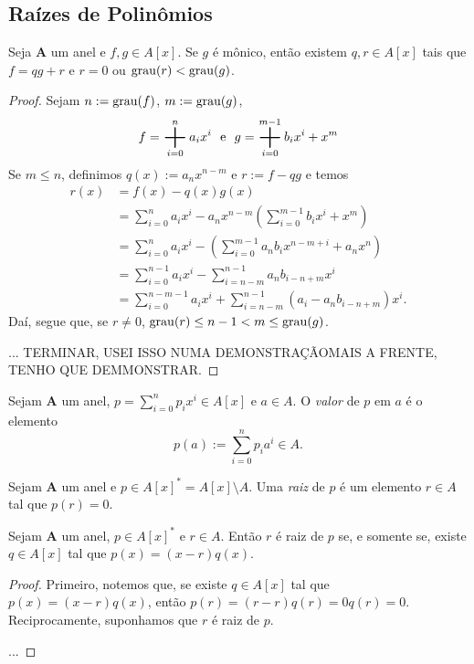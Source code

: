 \subsection{Raízes de Polinômios}

\begin{prop}
Seja $\bm A$ um anel e $f,g \in A[x]$. Se $g$ é mônico, então existem $q,r \in A[x]$ tais que $f=qg+r$ e $r=0$ ou $\operatorname{grau}(r) < \operatorname{grau}(g)$.
\end{prop}
\begin{proof}
Sejam $n := \operatorname{grau}(f)$, $m := \operatorname{grau}(g)$,
	\begin{equation*}
	f = \sum_{i=0}^n a_ix^i \e g = \sum_{i=0}^{m-1} b_ix^i + x^m
	\end{equation*}
Se $m \leq n$, definimos $q(x) := a_nx^{n-m}$ e $r := f-qg$ e temos
	\begin{align*}
	r(x) &= f(x) - q(x)g(x) \\
	&= \sum_{i=0}^n a_ix^i - a_nx^{n-m}\left(\sum_{i=0}^{m-1} b_ix^i + x^m\right) \\
	&= \sum_{i=0}^n a_ix^i - \left(\sum_{i=0}^{m-1} a_nb_ix^{n-m+i} + a_nx^n\right) \\
	&= \sum_{i=0}^{n-1} a_ix^i - \sum_{i=n-m}^{n-1} a_nb_{i-n+m}x^i \\
	&= \sum_{i=0}^{n-m-1} a_ix^i + \sum_{i=n-m}^{n-1} (a_i - a_nb_{i-n+m})x^i.
	\end{align*}
Daí, segue que, se $r \neq 0$, $\operatorname{grau}(r) \leq n-1 < m  \leq \operatorname{grau}(g)$.

... TERMINAR, USEI ISSO NUMA DEMONSTRAÇÃOMAIS A FRENTE, TENHO QUE DEMMONSTRAR.
\end{proof}

\begin{defi}
Sejam $\bm A$ um anel, $p = \sum_{i=0}^n p_ix^i \in A[x]$ e $a \in A$. O \emph{valor} de $p$ em $a$ é o elemento
	\begin{equation*}
	p(a) := \sum_{i=0}^n p_ia^i \in A.
	\end{equation*}
\end{defi}

\begin{defi}
	Sejam $\bm A$ um anel e $p \in A[x]^* = A[x] \setminus A$. Uma \emph{raiz} de $p$ é um elemento $r \in A$ tal que $p(r)=0$.
\end{defi}

\begin{prop}
	Sejam $\bm A$ um anel, $p \in A[x]^*$ e $r \in A$. Então $r$ é raiz de $p$ se, e somente se, existe $q \in A[x]$ tal que $p(x)=(x-r)q(x)$.
\end{prop}
\begin{proof}
	Primeiro, notemos que, se existe $q \in A[x]$ tal que $p(x)=(x-r)q(x)$, então $p(r)=(r-r)q(r)=0q(r)=0$. Reciprocamente, suponhamos que $r$ é raiz de $p$.

	...
\end{proof}



